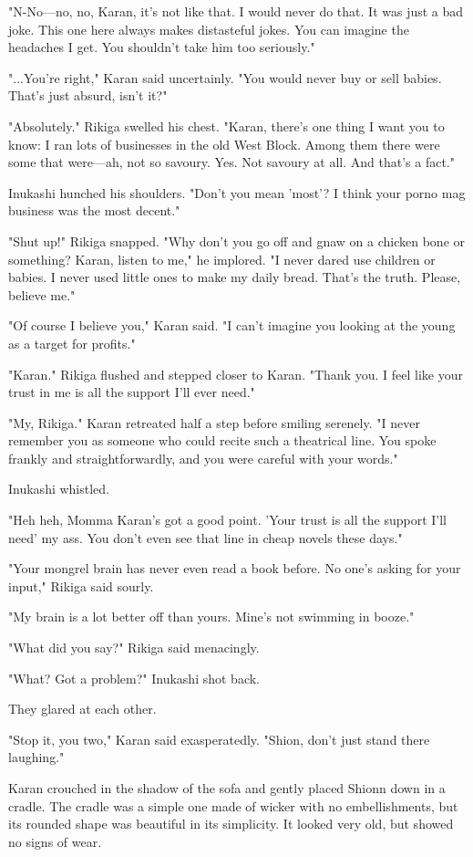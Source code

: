 "N-No---no, no, Karan, it's not like that. I would never do that. It was
just a bad joke. This one here always makes distasteful jokes. You can
imagine the headaches I get. You shouldn't take him too seriously."

"...You're right," Karan said uncertainly. "You would never buy or sell
babies. That's just absurd, isn't it?"

"Absolutely." Rikiga swelled his chest. "Karan, there's one thing I want
you to know: I ran lots of businesses in the old West Block. Among them
there were some that were---ah, not so savoury. Yes. Not savoury at all.
And that's a fact."

Inukashi hunched his shoulders. "Don't you mean 'most'? I think your
porno mag business was the most decent."

"Shut up!" Rikiga snapped. "Why don't you go off and gnaw on a chicken
bone or something? Karan, listen to me," he implored. "I never dared use
children or babies. I never used little ones to make my daily bread.
That's the truth. Please, believe me."

"Of course I believe you," Karan said. "I can't imagine you looking at
the young as a target for profits."

"Karan." Rikiga flushed and stepped closer to Karan. "Thank you. I feel
like your trust in me is all the support I'll ever need."

"My, Rikiga." Karan retreated half a step before smiling serenely. "I
never remember you as someone who could recite such a theatrical line.
You spoke frankly and straightforwardly, and you were careful with your
words."

Inukashi whistled.

"Heh heh, Momma Karan's got a good point. 'Your trust is all the support
I'll need' my ass. You don't even see that line in cheap novels these
days."

"Your mongrel brain has never even read a book before. No one's asking
for your input," Rikiga said sourly.

"My brain is a lot better off than yours. Mine's not swimming in booze."

"What did you say?" Rikiga said menacingly.

"What? Got a problem?" Inukashi shot back.

They glared at each other.

"Stop it, you two," Karan said exasperatedly. "Shion, don't just stand
there laughing."

Karan crouched in the shadow of the sofa and gently placed Shionn down
in a cradle. The cradle was a simple one made of wicker with no
embellishments, but its rounded shape was beautiful in its simplicity.
It looked very old, but showed no signs of wear.

